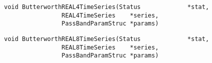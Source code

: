 \vspace{-0.1in}
\begin{verbatim}
void ButterworthREAL4TimeSeries(Status             *stat,
				REAL4TimeSeries    *series,
				PassBandParamStruc *params)
\end{verbatim}
\vspace{-0.1in}
\begin{verbatim}
void ButterworthREAL8TimeSeries(Status             *stat,
				REAL8TimeSeries    *series,
				PassBandParamStruc *params)
\end{verbatim}
